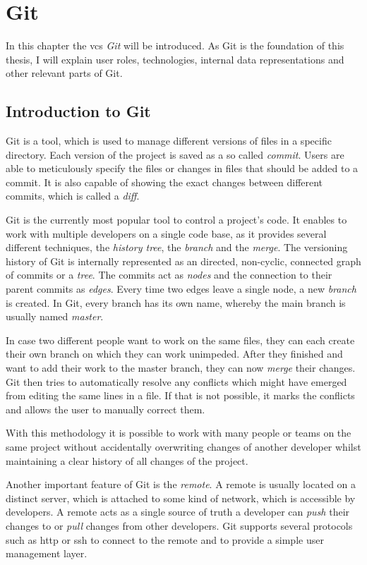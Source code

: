 \chapter{Git}\label{git-explanation}
In this chapter the \ac{vcs} \emph{Git} will be introduced.
As Git is the foundation of this thesis, I will explain user roles, technologies, internal data representations and other relevant parts of Git.


\section{Introduction to Git}\label{git-introduction}
Git is a tool, which is used to manage different versions of files in a specific directory.
Each version of the project is saved as a so called \emph{commit}.
Users are able to meticulously specify the files or changes in files that should be added to a commit.
It is also capable of showing the exact changes between different commits, which is called a \emph{diff}.

Git is the currently  most popular tool to control a project's code.
It enables to work with multiple developers on a single code base, as it provides several different techniques, the \emph{history tree}, the \emph{branch} and the \emph{merge}.
The versioning history of Git is internally represented as an directed, non-cyclic, connected graph of commits or a \emph{tree}.
The commits act as \emph{nodes} and the connection to their parent commits as \emph{edges}.
Every time two edges leave a single node, a new \emph{branch} is created.
In Git, every branch has its own name, whereby the main branch is usually named \emph{master}.

In case two different people want to work on the same files, they can each create their own branch on which they can work unimpeded.
After they finished and want to add their work to the master branch, they can now \emph{merge} their changes.
Git then tries to automatically resolve any conflicts which might have emerged from editing the same lines in a file.
If that is not possible, it marks the conflicts and allows the user to manually correct them.


With this methodology it is possible to work with many people or teams on the same project without accidentally overwriting changes of another developer whilst maintaining a clear history of all changes of the project.

Another important feature of Git is the \emph{remote}.
A remote is usually located on a distinct server, which is attached to some kind of network, which is accessible by developers.
A remote acts as a single source of truth a developer can \emph{push} their changes to or \emph{pull} changes from other developers.
Git supports several protocols such as \ac{http} or \ac{ssh} to connect to the remote and to provide a simple user management layer.



